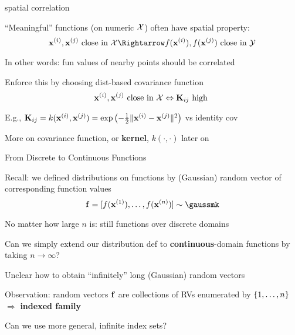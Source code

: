 \documentclass[11pt,compress,t,notes=noshow, xcolor=table]{beamer}
\begin{document}
\begin{framei}{spatial correlation}
\item ``Meaningful'' functions (on numeric $\Xspace$) often have spatial property:
$$\xi, \xi[j] \text{ close in } \Xspace \Rightarrow f(\xi), f(\xi[j]) \text{ close in } \Yspace$$
\item In other words: fun values of nearby points should be correlated
\item Enforce this by choosing dist-based covariance function
$$ \xi[i], \xi[j] \text{ close in } \Xspace \Leftrightarrow \Kmat_{ij} \text{ high }$$
\item E.g., $\Kmat_{ij} = k(\xi, \xi[j]) = \exp \left(- \tfrac{1}{2} \| \xi - \xi[j] \|^2 \right)$ vs identity cov
\vfill
{}
\item More on covariance function, or \textbf{kernel}, $k(\cdot, \cdot)$ later on
\end{framei} 

\begin{framei}[sep=L]{From Discrete to Continuous Functions}
\item Recall: we defined distributions on functions by (Gaussian) random vector of corresponding function values 
$$\fv = \fvec \sim \gaussmk$$
\item No matter how large $n$ is: still functions over discrete domains
\item Can we simply extend our distribution def to \textbf{continuous}-domain functions by taking $n \rightarrow \infty$?
\item Unclear how to obtain ``infinitely'' long (Gaussian) random vectors
\item Observation: random vectors $\fv$ are collections of RVs enumerated by $\nset$ $\Rightarrow$ \textbf{indexed family} 
\item Can we use more general, infinite index sets?
\end{framei}
\end{document}
